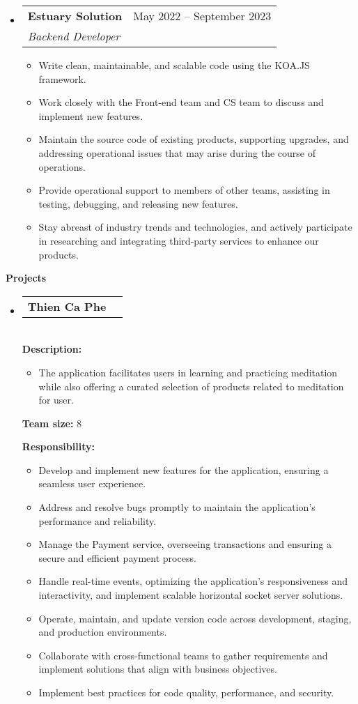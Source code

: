 \documentclass[letterpaper,12pt]{article}[leftmargin=*]
\makeatletter
\def \entryspacing {-0pt}
\renewcommand{\section}[2]{\vspace{5pt}
  \colorbox{secondary}{\color{white}\raggedbottom\normalsize\textbf{{#1}{\hspace{7pt}#2}}}
}
\newcommand{\resumeEntryStart}{\begin{itemize}[leftmargin=2.5mm]}
\newcommand{\resumeEntryEnd}{\end{itemize}\vspace{\entryspacing}}
\newcommand{\resumeItemListStart}{\begin{itemize}[leftmargin=4.5mm]}
\newcommand{\resumeItemListEnd}{\end{itemize}}
\newcommand{\resumeItem}[1]{
  \item\small{
    {#1 \vspace{-2pt}}
  }
}
\newcommand{\resumeEntryTSDL}[4]{
  \vspace{-1pt}\item[]
    \begin{tabularx}{0.97\textwidth}{X@{\hspace{60pt}}r}
      \textbf{\color{primary}#1} & {\firabook\color{accent}\small#2} \\
      \textit{\color{accent}\small#3} & \textit{\color{accent}\small#4} \\
    \end{tabularx}\vspace{-6pt}
}
\newcommand{\resumeEntryTD}[2]{
  \vspace{-1pt}\item[]
    \begin{tabularx}{0.97\textwidth}{X@{\hspace{60pt}}r}
      \textbf{\color{primary}#1} & {\firabook\color{accent}\small#2} \\
    \end{tabularx}\vspace{-6pt}
}
\makeatother
\begin{document}
  \resumeEntryStart
    \resumeEntryTSDL
      {Estuary Solution}{May 2022 -- September 2023}
      {Backend Developer}{}
    \resumeItemListStart
      \resumeItem {Write clean, maintainable, and scalable code using the KOA.JS framework.}
      \resumeItem {Work closely with the Front-end team and CS team to discuss and implement new features.}
      \resumeItem {Maintain the source code of existing products, supporting upgrades, and addressing operational issues that may arise during the course of operations.}
      \resumeItem{Provide operational support to members of other teams, assisting in testing, debugging, and releasing new features.}
      \resumeItem{Stay abreast of industry trends and technologies, and actively participate in researching and integrating third-party services to enhance our products.}
    \resumeItemListEnd
  \resumeEntryEnd

\section{\faFlask}{Projects}

  \resumeEntryStart
    \resumeEntryTD
      {Thien Ca Phe}{}

        \textbf{\\Description: }
        
            \resumeItemListStart
              \resumeItem {The application facilitates users in learning and practicing meditation while also offering a curated selection of products related to meditation for user.}
            \resumeItemListEnd


        \textbf{Team size: }8

  
        \textbf{Responsibility: }
            \resumeItemListStart
                \resumeItem{Develop and implement new features for the application, ensuring a seamless user experience.}
                \resumeItem{Address and resolve bugs promptly to maintain the application's performance and reliability.}
                \resumeItem{Manage the Payment service, overseeing transactions and ensuring a secure and efficient payment process.}
                \resumeItem{Handle real-time events, optimizing the application's responsiveness and interactivity, and implement scalable horizontal socket server solutions.}
                \resumeItem{Operate, maintain, and update version code across development, staging, and production environments.}
                \resumeItem{Collaborate with cross-functional teams to gather requirements and implement solutions that align with business objectives.}
                \resumeItem{Implement best practices for code quality, performance, and security.}
            \resumeItemListEnd
  \resumeEntryEnd
\end{document}
